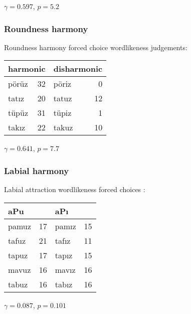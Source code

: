 $\gamma = 0.597$, $p = 5.2$

\subsubsection{Roundness harmony}

\begin{example}
Roundness harmony forced choice wordlikeness judgements: 

\vspace{0.5\baselineskip}
\begin{tabular}{l r l r}
\toprule
\multicolumn{2}{l}{harmonic} & \multicolumn{2}{l}{disharmonic} \\
\midrule
pörüz & 32 & pöriz & 0  \\
tatız & 20 & tatuz & 12 \\
tüpüz & 31 & tüpiz & 1  \\
takız & 22 & takuz & 10 \\
\bottomrule
\end{tabular}
\end{example}

$\gamma = 0.641$, $p = 7.7$


\subsubsection{Labial harmony}

\begin{example}
Labial attraction wordlikeness forced choices \citep[314]{Zimmer1969}: 

\vspace{0.5\baselineskip}
\begin{tabular}{l r l r}
\toprule
\multicolumn{2}{l}{aPu} & \multicolumn{2}{l}{aPı} \\
\midrule
pamuz & 17              & pamız & 15 \\
tafuz & 21              & tafız & 11 \\
tapuz & 17              & tapız & 15 \\
mavuz & 16              & mavız & 16 \\
tabuz & 16              & tabız & 16 \\
\bottomrule
\end{tabular}
\end{example}

$\gamma = 0.087$, $p = 0.101$
